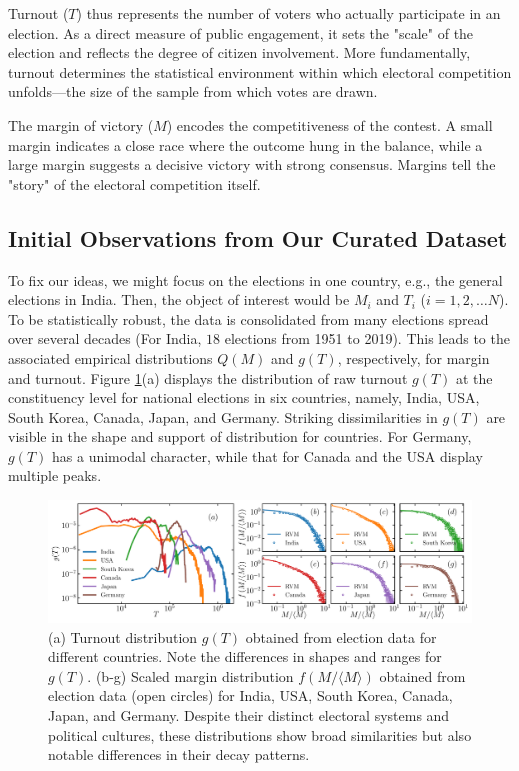 Turnout ($T$) thus represents the number of voters who actually participate in an election. As a direct measure of public engagement, it sets the "scale" of the election and reflects the degree of citizen involvement. More fundamentally, turnout determines the statistical environment within which electoral competition unfolds—the size of the sample from which votes are drawn.

The margin of victory ($M$) encodes the competitiveness of the contest. A small margin indicates a close race where the outcome hung in the balance, while a large margin suggests a decisive victory with strong consensus. Margins tell the "story" of the electoral competition itself.

\subsection{Initial Observations from Our Curated Dataset}

To fix our ideas, we might focus on the elections in one country, e.g., the general elections in India. Then, the object of interest would be $M_i$ and $T_i$ ($i=1,2, \dots N$). To be statistically robust, the data is consolidated from many elections spread over several decades (For India, $18$ elections from 1951 to 2019). This leads to the associated empirical distributions $Q(M)$ and $g(T)$, respectively, for margin and turnout. Figure \ref{fig:turnout_margin}(a) displays the distribution of raw turnout $g(T)$ at the constituency level for national elections in six countries, namely, India, USA, South Korea, Canada, Japan, and Germany. Striking dissimilarities in $g(T)$ are visible in the shape and support of distribution for countries. For Germany, $g(T)$ has a unimodal character, while that for Canada and the USA display multiple peaks. 

\begin{figure}[H]
    \centering
    \includegraphics[width=\textwidth]{chapters/chapter4/fig_1.pdf}
    \caption{(a) Turnout distribution $g(T)$ obtained from election data for different countries. Note the differences in shapes and ranges for $g(T)$. (b-g) Scaled margin distribution $f(M/\langle M \rangle)$ obtained from election data (open circles) for India, USA, South Korea, Canada, Japan, and Germany. Despite their distinct electoral systems and political cultures, these distributions show broad similarities but also notable differences in their decay patterns.}
    \label{fig:turnout_margin}
\end{figure}

